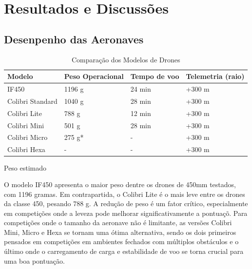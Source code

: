 \documentclass[conference]{IEEEtran}
\begin{document}
\section{Resultados e Discussões}

\subsection{Desenpenho das Aeronaves}

\begin{table}[htbp]
\centering
\caption{Comparação dos Modelos de Drones}
\label{tab:drone_comparison}
\begin{tabularx}{\columnwidth}{|l|X|X|X|}
\hline
\textbf{Modelo}         & \textbf{Peso Operacional} & \textbf{Tempo de voo} & \textbf{Telemetria (raio)} \\ \hline
IF450                  & 1196 g                    & 24 min               & +300 m                     \\ \hline
Colibri Standard       & 1040 g                    & 28 min               & +300 m                     \\ \hline
Colibri Lite           & 788 g                     & 12 min               & +300 m                     \\ \hline
Colibri Mini           & 501 g                     & 28 min               & +300 m                     \\ \hline
Colibri Micro          & 275 g*                    & -                    & +300 m                     \\ \hline
Colibri Hexa           & -                         & -                    & +300 m                     \\ \hline
\end{tabularx}
\newline
\small *Peso estimado
\end{table}

O modelo IF450 apresenta o maior peso dentre os drones de 450mm testados, com 1196 gramas. Em contrapartida, o Colibri Lite é o mais leve entre os drones da classe 450, pesando 788 g. A redução de peso é um fator crítico, especialmente em competições onde a leveza pode melhorar significativamente a pontuaçõ. Para competições onde o tamanho da aeronave não é limitante, as versões Colibri Mini, Micro e Hexa se tornam uma ótima alternativa, sendo os dois primeiros pensados em competições em ambientes fechados com múltiplos obstáculos e o último onde o carregamento de carga e estabilidade de voo se torna crucial para uma boa pontuação.
\end{document}

